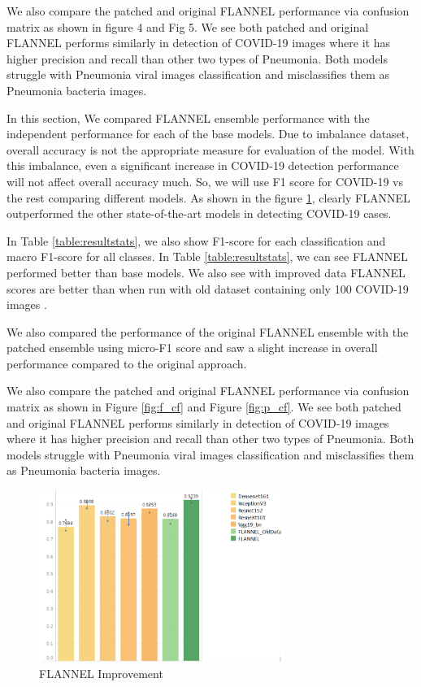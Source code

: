 \documentclass{sigkddExp}
\begin{document}
We also compare the patched and original FLANNEL performance via confusion
matrix as shown in figure 4 and Fig 5. We see both patched and original FLANNEL
performs similarly in detection of COVID-19 images where it has higher precision
and recall than other two types of Pneumonia. Both models struggle with
Pneumonia viral images classification and misclassifies them as Pneumonia
bacteria images.

In this section, We compared FLANNEL ensemble performance with the independent
performance for each of the base models. Due to imbalance dataset, overall
accuracy is not the appropriate measure for evaluation of the model. With this
imbalance, even a significant increase in COVID-19 detection performance will
not affect overall accuracy much. So, we will use F1 score for COVID-19 vs the
rest comparing different models. As shown in the figure \ref{fig:f1score},
clearly FLANNEL outperformed the other state-of-the-art models in detecting
COVID-19 cases.

In Table \ref{table:resultstats}, we also show F1-score for each classification
and macro F1-score for all classes. In Table \ref{table:resultstats}, we can see
FLANNEL performed better than base models. We also see with improved data FLANNEL
scores are better than when run with old dataset containing only 100 COVID-19 images
\cite{10.1093/jamia/ocaa280}.


We also compared the performance of the original FLANNEL ensemble with the
patched ensemble using micro-F1 score and saw a slight increase in overall
performance compared to the original approach.



We also compare the patched and original FLANNEL performance via confusion
matrix as shown in Figure \ref{fig:f_cf} and Figure \ref{fig:p_cf}. We see both
patched and original FLANNEL performs similarly in detection of COVID-19 images
where it has higher precision and recall than other two types of Pneumonia. Both
models struggle with Pneumonia viral images classification and misclassifies
them as Pneumonia bacteria images.


\begin{figure}[H]
    \includegraphics[width=8cm]{../doc/images/F1Score_vs_rest.png}
    \caption{FLANNEL Improvement}
    \label{fig:f1score}
\end{figure}
\end{document}
